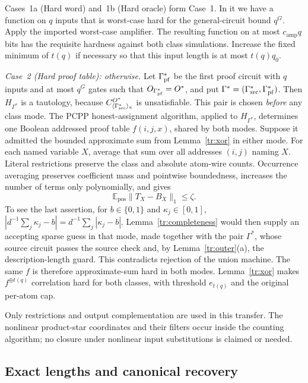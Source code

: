 \documentclass[11pt,letterpaper]{article}
\theoremstyle{definition}
\theoremstyle{remark}
\begin{document}
Cases~1a (Hard word) and~1b (Hard oracle) form Case~1. In it we have a
function on $q$ inputs
that is worst-case hard for the general-circuit bound $q^G$.
Apply the imported worst-case amplifier. The resulting function on at
most $c_{\mathrm{amp}}q$ bits has the requisite hardness against both
class simulations. Increase the fixed minimum of $t(q)$ if necessary
so that this input length is at most $t(q)q_0$.

\emph{Case~2 (Hard proof table): otherwise.} Let $\Gamma^*_{\rm pf}$ be
the first proof circuit with $q$ inputs and at most $q^G$ gates such
that $O_{\Gamma^*_{\rm pf}}=O^*$, and put
$\Gamma^*=(\Gamma^*_{\rm src},\Gamma^*_{\rm pf})$. Then $H_{\Gamma^*}$
is a tautology, because $C^{O^*}_{\langle\Gamma^*_{\rm src}\rangle_a}$
is unsatisfiable. This pair is chosen \emph{before} any class mode. The PCPP honest-assignment algorithm,
applied to $H_{\Gamma^*}$, determines one Boolean addressed proof table
$f(i,j,x)$, shared by both modes.
Suppose it admitted the bounded approximate sum from
Lemma~\ref{tr:xor} in either mode. For each named variable $X$, average
that sum over all addresses $(i,j)$ naming $X$.
Literal restrictions preserve the class and absolute atom-wire counts.
Occurrence averaging preserves coefficient mass and pointwise
boundedness, increases the number of terms only polynomially, and gives
\[
 \mathbb E_{\mathrm{pos}}\|T_X-B_X\|_1\le\zeta.
\]
To see the last assertion, for $b\in\{0,1\}$ and $\kappa_j\in[0,1]$,
$|d^{-1}\sum_j\kappa_j-b|=d^{-1}\sum_j|\kappa_j-b|$.
Lemma~\ref{tr:completeness} would then supply an accepting sparse guess
in that mode, made together with the pair $\Gamma^*$, whose source
circuit passes the source check and, by Lemma~\ref{tr:outer}(a), the
description-length guard. This contradicts rejection of the union
machine.
The same $f$ is therefore approximate-sum hard in both modes.
Lemma~\ref{tr:xor} makes $f^{\oplus t(q)}$ correlation hard for
both classes, with threshold $e_{t(q)}$ and the original per-atom cap.

Only restrictions and output complementation are used in this transfer.
The nonlinear product-star coordinates and their filters occur inside
the counting algorithm; no closure under nonlinear input substitutions
is claimed or needed.

\subsection{Exact lengths and canonical recovery}
\label{tr:lengths}
\end{document}

